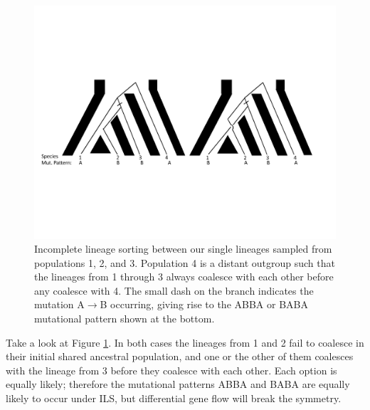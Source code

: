 \begin{figure}
\begin{center}
\includegraphics[width=\textwidth]{figures/Genetic_drift/ILS/ABBA_BABA_coal.pdf}
\end{center}
\caption{ Incomplete lineage sorting between our single lineages sampled from populations 1, 2, and 3. Population 4 is a distant outgroup
such that the lineages from 1 through 3 always coalesce with each other before any coalesce with 4. The small dash on the branch indicates the mutation A$\rightarrow$B occurring, giving rise to the
ABBA or BABA mutational pattern shown at the bottom. } \label{fig:ABBA_BABA}
\end{figure}

Take a look at Figure \ref{fig:ABBA_BABA}. In both cases the lineages from 1 and 2 fail to coalesce in
their initial shared ancestral population, and one or the other of them
coalesces with the lineage from 3 before they coalesce with each other. Each option is equally
likely; therefore the mutational patterns ABBA and BABA are equally
likely to occur under ILS, but differential gene flow will break the symmetry.  

